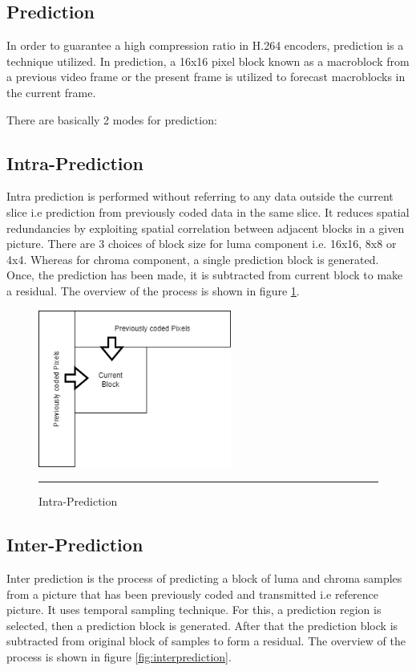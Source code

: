 \subsection{Prediction}
In order to guarantee a high compression ratio in H.264 encoders, prediction is a technique utilized. In prediction, a 16x16 pixel block known as a macroblock from a previous video frame or the present frame is utilized to forecast macroblocks in the current frame. 

There are basically 2 modes for prediction:

\subsection{Intra-Prediction}
Intra prediction is performed without referring to any data outside the current slice i.e prediction from previously coded data in the same slice. It reduces spatial redundancies by exploiting spatial correlation between adjacent blocks in a given picture. There are 3 choices of block size for luma component i.e. 16x16, 8x8 or 4x4. Whereas for chroma component, a single prediction block is generated. Once, the prediction has been made, it is subtracted from current block to make a residual. The overview of the process is shown in figure \ref{fig:intraprediction}.

\begin{figure}[htbp]
	\centering
	\includegraphics[width = 2.5in]{./Figures/comp1.png}
	\rule{35em}{0.5pt}
	\caption{Intra-Prediction}
	\label{fig:intraprediction}
\end{figure}

\subsection{Inter-Prediction}
Inter prediction is the process of predicting a block of luma and chroma samples from a picture that has been previously coded and transmitted i.e reference picture. It uses temporal sampling technique. For this, a prediction region is selected, then a prediction block is generated. After that the prediction block is subtracted from original block of samples to form a residual. The overview of the process is shown in figure \ref{fig:interprediction}.

